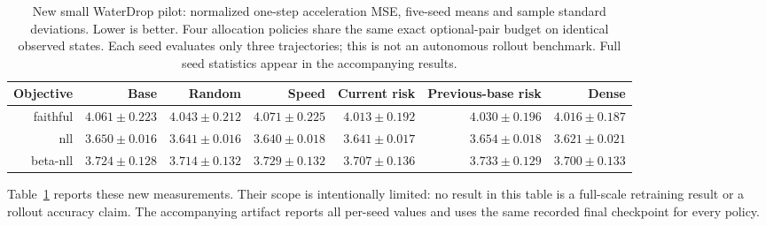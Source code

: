 \begin{table}[t]
\centering\scriptsize\setlength{\tabcolsep}{3pt}
\caption{New small WaterDrop pilot: normalized one-step acceleration MSE, five-seed means and sample standard deviations. Lower is better. Four allocation policies share the same exact optional-pair budget on identical observed states. Each seed evaluates only three trajectories; this is not an autonomous rollout benchmark. Full seed statistics appear in the accompanying results.}
\label{tab:pilot}
\begin{tabular}{rrrrrrr}
\toprule
Objective & Base & Random & Speed & Current risk & Previous-base risk & Dense\\
\midrule
faithful & $4.061\pm0.223$ & $4.043\pm0.212$ & $4.071\pm0.225$ & $4.013\pm0.192$ & $4.030\pm0.196$ & $4.016\pm0.187$ \\
nll & $3.650\pm0.016$ & $3.641\pm0.016$ & $3.640\pm0.018$ & $3.641\pm0.017$ & $3.654\pm0.018$ & $3.621\pm0.021$ \\
beta-nll & $3.724\pm0.128$ & $3.714\pm0.132$ & $3.729\pm0.132$ & $3.707\pm0.136$ & $3.733\pm0.129$ & $3.700\pm0.133$ \\
\bottomrule
\end{tabular}
\end{table}
Table~\ref{tab:pilot} reports these new measurements. Their scope is intentionally limited: no result in this table is a full-scale retraining result or a rollout accuracy claim. The accompanying artifact reports all per-seed values and uses the same recorded final checkpoint for every policy.
